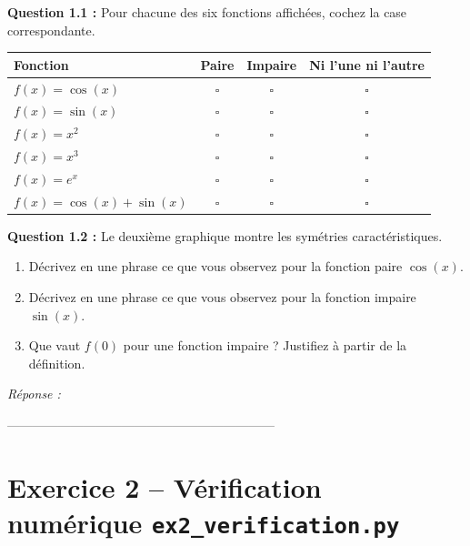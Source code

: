 \documentclass[12pt,a4paper]{article}
\newcommand{\cadreReponse}[1][4]{%
    \begin{mdframed}[backgroundcolor=repbg, linecolor=repframe, linewidth=1pt,
        roundcorner=4pt, innertopmargin=6pt, innerbottommargin=6pt]
    \textcolor{repframe}{\small\textit{Réponse :}}\\[#1\baselineskip]
    \end{mdframed}%
}
\begin{document}
\begin{exercicebox}
\textbf{Question 1.1 :} Pour chacune des six fonctions affichées, cochez la case correspondante.

\medskip
\renewcommand{\arraystretch}{1.8}
\begin{center}
\begin{tabular}{|l|c|c|c|}
    \hline
    \textbf{Fonction} & \textbf{Paire} & \textbf{Impaire} & \textbf{Ni l'une ni l'autre} \\
    \hline
    $f(x) = \cos(x)$           & $\square$ & $\square$ & $\square$ \\
    \hline
    $f(x) = \sin(x)$           & $\square$ & $\square$ & $\square$ \\
    \hline
    $f(x) = x^2$               & $\square$ & $\square$ & $\square$ \\
    \hline
    $f(x) = x^3$               & $\square$ & $\square$ & $\square$ \\
    \hline
    $f(x) = e^x$               & $\square$ & $\square$ & $\square$ \\
    \hline
    $f(x) = \cos(x) + \sin(x)$ & $\square$ & $\square$ & $\square$ \\
    \hline
\end{tabular}
\end{center}
\end{exercicebox}

\begin{exercicebox}
\textbf{Question 1.2 :} Le deuxième graphique montre les symétries caractéristiques.
\begin{enumerate}[label=\alph*)]
    \item Décrivez en une phrase ce que vous observez pour la fonction paire $\cos(x)$.
    \item Décrivez en une phrase ce que vous observez pour la fonction impaire $\sin(x)$.
    \item Que vaut $f(0)$ pour une fonction impaire ? Justifiez à partir de la définition.
\end{enumerate}
\end{exercicebox}

\cadreReponse[9]

%

\newpage

 ---------------------------------------------------------------
\section{Exercice 2 -- Vérification numérique \hfill\normalsize\texttt{ex2\_verification.py}}
\end{document}
